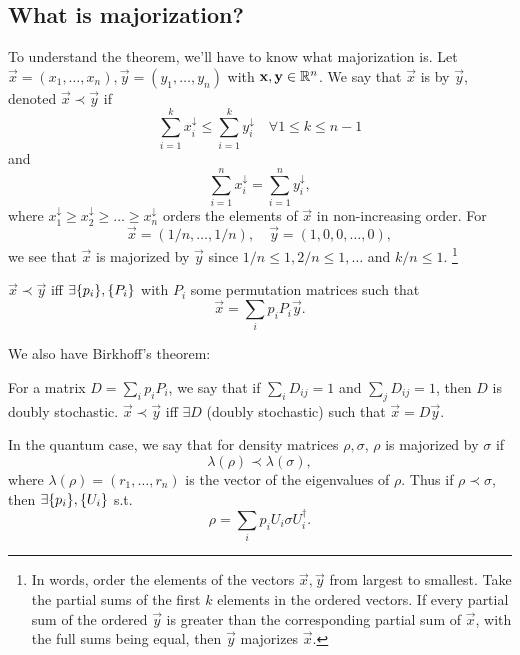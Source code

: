 \subsection*{What is majorization?} 
To understand the theorem, we'll have to know what majorization is. Let $\vec x=(x_1,\ldots, x_n), \vec y=(y_1,\ldots,y_n)$ with $\boldsymbol{\mathbf{x}},\boldsymbol{\mathbf{y}}\in \mathbb{R}^n$. We say that $\vec x$ is  by $\vec y$, denoted $\vec x \prec \vec y$ if
\begin{equation}
    \sum_{i=1}^k x_i^{\downarrow} \leq \sum_{i=1}^k y_i^{\downarrow} \quad\forall 1\leq k \leq n-1
\end{equation}
and
\begin{equation}
    \sum_{i=1}^n x_i^{\downarrow} = \sum_{i=1}^n y_i^{\downarrow},
\end{equation}
where $x_1^{\downarrow} \geq x_2^{\downarrow} \geq \ldots \geq x_n^{\downarrow}$ orders the elements of $\vec x$ in non-increasing order. For
\begin{equation}
    \vec x=(1/n,\ldots, 1/n),\quad \vec y=(1,0,0,\ldots,0),
\end{equation}
we see that $\vec x$ is majorized by $\vec y$ since $1/n \leq 1, 2/n \leq 1,\ldots$ and $k/n \leq 1$.%
    \footnote{In words, order the elements of the vectors $\vec x,\vec y$ from largest to smallest. Take the partial sums of the first $k$ elements in the ordered vectors. If every partial sum of the ordered $\vec y$ is greater than the corresponding partial sum of $\vec x$, with the full sums being equal, then $\vec y$ majorizes $\vec x$.}

\begin{thm}
    $\vec x \prec \vec y$ iff $\exists\{p_i\},\{P_i\}$ with $P_i$ some permutation matrices such that
    \begin{equation}
        \vec x = \sum_i p_i P_i \vec y.
    \end{equation}
\end{thm}
We also have Birkhoff's theorem:
\begin{thm}
    For a matrix $D=\sum_i p_i P_i$, we say that if $\sum_i D_{ij}=1$ and $\sum_j D_{ij}=1$, then $D$ is doubly stochastic. $\vec x \prec \vec y$ iff $\exists D$ (doubly stochastic) such that $\vec x = D \vec y.$
\end{thm}

In the quantum case, we say that for density matrices $\rho,\sigma$, $\rho$ is majorized by $\sigma$ if
\begin{equation}
    \lambda(\rho) \prec \lambda (\sigma),
\end{equation}
where $\lambda(\rho)=(r_1,\ldots,r_n)$ is the vector of the eigenvalues of $\rho$. Thus if $\rho \prec \sigma$, then $\exists \{p_i\},\{U_i\}$ s.t. 
\begin{equation}
    \rho = \sum_i p_i U_i \sigma U_i^\dagger.
\end{equation}

